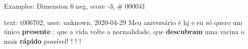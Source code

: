\begin{frame}{Examples: Dimension 6 neg, score -3, \# 000041}
\footnotesize
\begin{alertblock}{text: t006702, user: unknown, 2020-04-29}
Meu aniversário é hj e eu só quero um único \textbf{presente} : que a vida 
volte a normalidade, que \textbf{descubram} uma vacina o mais \textbf{rápido} 
possível! ! ! ! 
\end{alertblock}
\end{frame}
